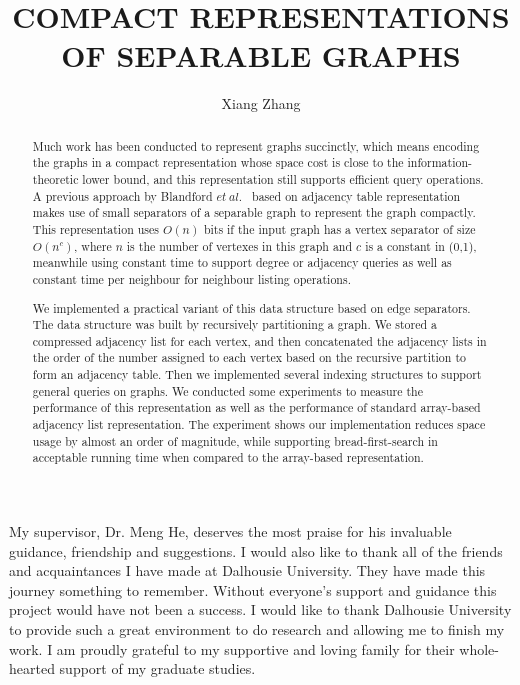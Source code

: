 \documentclass[12pt,glossary]{dalthesis}
\begin{document}
\macs  %
\title{COMPACT REPRESENTATIONS OF SEPARABLE GRAPHS}
\author{Xiang Zhang}





\frontmatter





\begin{abstract}
Much work has been conducted to represent graphs succinctly, which means encoding the graphs in a compact representation whose space cost is close to the information-theoretic lower bound, and this representation still supports efficient query operations. A previous approach by Blandford $et \ al.$~\cite{compact-representation} based on adjacency table representation makes use of small separators of a separable graph to represent the graph compactly. This representation uses $O(n)$ bits if the input graph has a vertex separator of size $O(n^{c})$, where $n$ is the number of vertexes in this graph and $c$ is a constant in (0,1), meanwhile using constant time to support degree or adjacency queries as well as constant time per neighbour for neighbour listing operations.


We implemented a practical variant of this data structure based on edge separators. The data structure was built by recursively partitioning a graph. We stored a compressed adjacency list for each vertex, and then concatenated the adjacency lists in the order of the number assigned to each vertex based on the recursive partition to form an adjacency table. Then we implemented several indexing structures to support general queries on graphs. We conducted some experiments to measure the performance of this representation as well as the performance of standard array-based adjacency list representation. The experiment shows our implementation reduces space usage by almost an order of magnitude, while supporting bread-first-search in acceptable running time when compared to the array-based representation.
\end{abstract}

\printglossary

\begin{acknowledgements}
My supervisor, Dr. Meng He, deserves the most praise for his invaluable guidance, friendship and suggestions. I would also like to thank all of the friends and acquaintances I have made at Dalhousie University. They have made this journey something to remember. Without everyone’s support and guidance this project would have not been a success.
I would like to thank Dalhousie University to provide such a great environment
to do research and allowing me to finish my work.
I am proudly grateful to my supportive and loving family for their whole-hearted
support of my graduate studies.
\end{acknowledgements}
\end{document}
